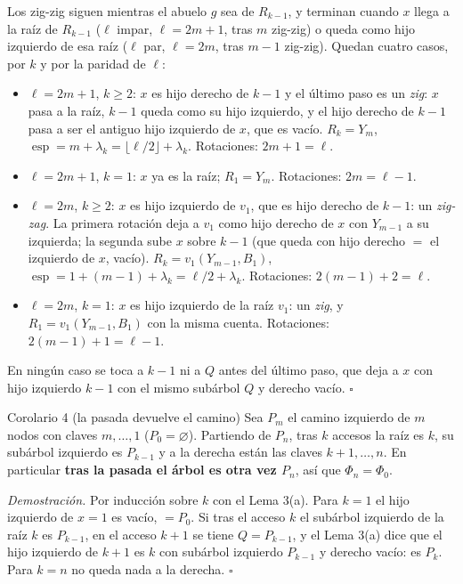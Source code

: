 \documentclass[11pt]{article}
\newcommand{\esp}{\operatorname{esp}}
\begin{document}
Los zig-zig siguen mientras el abuelo $g$ sea de $R_{k-1}$, y terminan cuando $x$ llega a la raíz de $R_{k-1}$ ($\ell$ impar, $\ell=2m+1$, tras $m$ zig-zig) o queda como hijo izquierdo de esa raíz
($\ell$ par, $\ell=2m$, tras $m-1$ zig-zig). Quedan cuatro casos, por $k$ y por la paridad de $\ell$:
\begin{itemize}[leftmargin=14pt,itemsep=2pt]
\item $\ell=2m+1$, $k\ge2$: $x$ es hijo derecho de $k-1$ y el último paso es un \emph{zig}: $x$ pasa a la raíz, $k-1$ queda como su hijo izquierdo, y el hijo derecho de $k-1$ pasa a ser el antiguo hijo izquierdo de $x$, que es vacío. $R_k=Y_m$, $\esp=m+\lambda_k=\lfloor\ell/2\rfloor+\lambda_k$. Rotaciones: $2m+1=\ell$.
\item $\ell=2m+1$, $k=1$: $x$ ya es la raíz; $R_1=Y_m$. Rotaciones: $2m=\ell-1$.
\item $\ell=2m$, $k\ge2$: $x$ es hijo izquierdo de $v_1$, que es hijo derecho de $k-1$: un \emph{zig-zag}. La primera rotación deja a $v_1$ como hijo derecho de $x$ con
$Y_{m-1}$ a su izquierda; la segunda sube $x$ sobre $k-1$ (que queda con hijo derecho $=$ el izquierdo de $x$, vacío). $R_k=v_1(Y_{m-1},B_1)$, $\esp=1+(m-1)+\lambda_k=\ell/2+\lambda_k$.
Rotaciones: $2(m-1)+2=\ell$.
\item $\ell=2m$, $k=1$: $x$ es hijo izquierdo de la raíz $v_1$: un \emph{zig}, y $R_1=v_1(Y_{m-1},B_1)$ con la misma cuenta. Rotaciones: $2(m-1)+1=\ell-1$.
\end{itemize}
En ningún caso se toca a $k-1$ ni a $Q$ antes del último paso, que deja a $x$ con hijo izquierdo $k-1$ con el mismo subárbol $Q$ y derecho vacío. $\square$

\begin{resultado}{Corolario 4 (la pasada devuelve el camino)}
Sea $P_m$ el camino izquierdo de $m$ nodos con claves $m,\dots,1$ ($P_0=\varnothing$). Partiendo de $P_n$, tras $k$ accesos la raíz es $k$, su subárbol izquierdo
es $P_{k-1}$ y a la derecha están las claves $k+1,\dots,n$. En particular \textbf{tras la pasada el árbol es otra vez $P_n$}, así que $\Phi_n=\Phi_0$.
\end{resultado}
\textit{Demostración.} Por inducción sobre $k$ con el Lema 3(a). Para $k=1$ el hijo izquierdo de $x=1$ es vacío, $=P_0$. Si tras el acceso $k$ el subárbol izquierdo de la raíz $k$ es $P_{k-1}$, en el acceso
$k+1$ se tiene $Q=P_{k-1}$, y el Lema 3(a) dice que el hijo izquierdo de $k+1$ es $k$ con subárbol izquierdo $P_{k-1}$ y derecho vacío: es $P_k$. Para $k=n$ no queda nada a la derecha. $\square$
\end{document}
